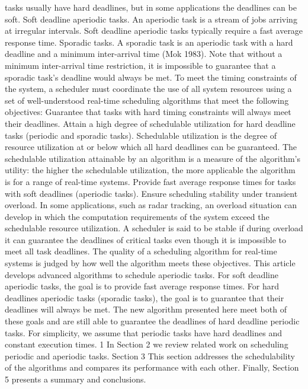 \documentclass[conference]{IEEEtran}
\begin{document}
tasks usually have hard deadlines, but in some applications the deadlines can be soft.
Soft deadline aperiodic tasks. An aperiodic task is a stream of jobs arriving at irregular
intervals. Soft deadline aperiodic tasks typically require a fast average response time.
Sporadic tasks. A sporadic task is an aperiodic task with a hard deadline and a minimum
inter-arrival time (Mok 1983). Note that without a minimum inter-arrival time restriction,
it is impossible to guarantee that a sporadic task's deadline would always be met.
To meet the timing constraints of the system, a scheduler must coordinate the use of
all system resources using a set of well-understood real-time scheduling algorithms that
meet the following objectives:
Guarantee that tasks with hard timing constraints will always meet their deadlines.
Attain a high degree of schedulable utilization for hard deadline tasks (periodic and sporadic
tasks). Schedulable utilization is the degree of resource utilization at or below which
all hard deadlines can be guaranteed. The schedulable utilization attainable by an algorithm
is a measure of the algorithm's utility: the higher the schedulable utilization, the more applicable the algorithm is for a range of real-time systems. Provide fast average response times for tasks with soft deadlines (aperiodic tasks). Ensure scheduling stability under transient overload. In some applications, such as radar tracking, an overload situation can develop in which the computation requirements of the system exceed the schedulable resource utilization. A scheduler is said to be stable if during overload it can guarantee the deadlines of critical tasks even though it is impossible to meet all task deadlines. The quality of a scheduling algorithm for real-time systems is judged by how well the algorithm meets these objectives. This article develops advanced algorithms to schedule aperiodic tasks. For soft deadline aperiodic tasks, the goal is to provide fast average response times. For hard deadlines aperiodic tasks (sporadic tasks), the goal is to guarantee that their deadlines will always be met. The new algorithm presented here meet both of these goals and are still able to guarantee the deadlines of hard deadline periodic tasks. For simplicity, we assume that periodic tasks have hard deadlines and constant execution times. 1 In Section 2 we review related work on scheduling periodic and aperiodic tasks. Section 3 This section addresses the schedulability of the algorithms and compares its performance with each other. Finally, Section 5 presents a summary and conclusions.  
\end{document}
